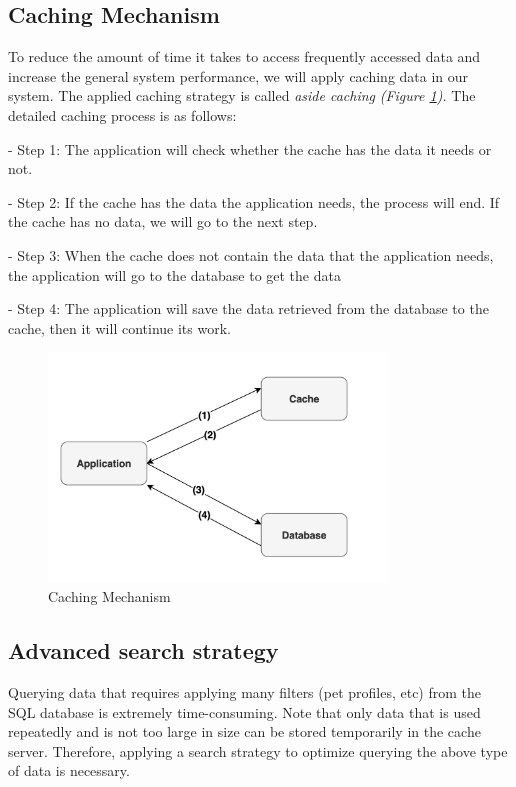 \subsection{Caching Mechanism}

To reduce the amount of time it takes to access frequently accessed data
and increase the general system performance, we will apply caching data
in our system. The applied caching strategy is called \emph{aside
    caching} \emph{(Figure \ref{fig:caching}).} The detailed caching process is as follows:

- Step 1: The application will check whether the cache has the data it
needs or not.

- Step 2: If the cache has the data the application needs, the process
will end. If the cache has no data, we will go to the next step.

- Step 3: When the cache does not contain the data that the application
needs, the application will go to the database to get the data

- Step 4: The application will save the data retrieved from the database
to the cache, then it will continue its work.

\begin{figure}[H]
    \centering
    \includegraphics[width=0.8\textwidth]{Figures/caching_strat.png}
    \caption{Caching Mechanism}
    \label{fig:caching}
\end{figure}

\subsection{Advanced search strategy}

Querying data that requires applying many filters (pet profiles, etc)
from the SQL database is extremely time-consuming. Note that only data
that is used repeatedly and is not too large in size can be stored
temporarily in the cache server. Therefore, applying a search strategy
to optimize querying the above type of data is necessary.

